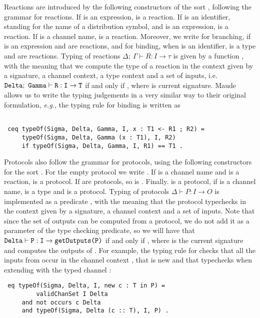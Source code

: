 Reactions are introduced by the following constructors of the sort
, following the grammar for reactions. If  is an expression,  is a reaction. If  is an identifier, standing for the name of a
distribution symbol, and  is an expression,  
is a reaction. If  is a channel name,  is a reaction.
Moreover, we write  for branching, if  is an expression and  are reactions, and  for binding, when  is an identifier,  is a type and 
 are reactions.
Typing of reactions $\Delta; \ \Gamma \vdash R : I \to \tau$ is given by a function
, 
with the meaning that
we compute the type of a reaction in the context given by a signature, a channel context, a type context and a set of inputs, 
i.e. $\texttt{Delta}; \ \texttt{Gamma} \vdash \texttt{R} : \texttt{I} \to \texttt{T}$ 
if and only if 
, where  is 
current signature. 
Maude allows us to write the typing
judgements in a very similar way to their original formulation, \emph{e.g.}, the typing rule for binding is written as
\begin{lstlisting}

 ceq typeOf(Sigma, Delta, Gamma, I, x : T1 <- R1 ; R2) = 
     typeOf(Sigma, Delta, Gamma (x : T1), I, R2)
     if typeOf(Sigma, Delta, Gamma, I, R1) == T1 .

\end{lstlisting}

Protocols also follow the grammar for protocols, using the following
constructors for the sort . For the empty protocol we write
. If  is a channel name and  is a 
reaction,  is a protocol. If  are protocols,
so is . Finally.  is a protocol,
if  is a channel name,  is a type and  is a protocol. Typing of protocols $\Delta \vdash P : I \to O$ is implemented as a predicate
, with the meaning that the protocol typechecks 
in the context given by a signature, a channel context and a set of inputs.
Note that since the set of outputs can be computed from a protocol, we
do not add it as a parameter of the type checking predicate, so we will have that
$\texttt{Delta} \vdash \texttt{P} : \texttt{I} \to \texttt{getOutputs(P)}$ 
if and only if
,
where  is the current signature and
 computes the outputs of .
For example, the typing rule for  checks that 
all the inputs from  occur in the channel context
, that  is new and that  typechecks
when extending  with the typed channel :
\begin{lstlisting}
 eq typeOf(Sigma, Delta, I, new c : T in P) =
         validChanSet I Delta
     and not occurs c Delta
     and typeOf(Sigma, Delta (c :: T), I, P) .   
\end{lstlisting}


